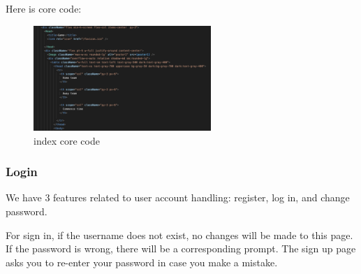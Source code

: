 \documentclass[singlecolumn]{article}
\begin{document}
Here is core code:

\begin{figure}[H]
    \centering
    \includegraphics[width=0.6\textwidth]{index_code.png}
    \caption{index core code}
    \label{fig:index_code}
\end{figure}

\subsubsection{Login}
We have 3 features related to user account handling: register, log in, and change password. 

For sign in, if the username does not exist, no changes will be made to this page. If the password is wrong, there will be a corresponding prompt. The sign up page asks you to re-enter your password in case you make a mistake. 
\end{document}

